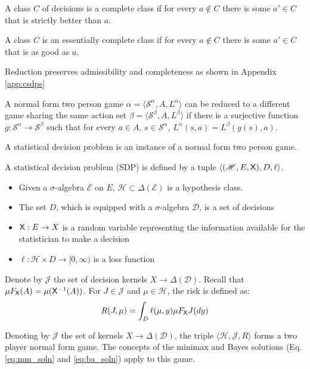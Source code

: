 \begin{definition}
A class $C$ of decisions is a complete class if for every $a\not\in C$ there is some $a'\in C$ that is strictly better than $a$.

A class $C$ is an essentially complete class if for every $a\not\in C$ there is some $a'\in C$ that is as good as $a$.
\end{definition}

Reduction preserves admissibility and completeness as shown in Appendix \ref{app:csdps}

\begin{definition}[Reduction]\label{def:red_sdp_CSDP}
A normal form two person game $\alpha = \langle \mathscr{S}^\alpha, A, L^\alpha\rangle$ can be reduced to a different game sharing the same action set $\beta = \langle \mathscr{S}^\beta, A, L^\beta \rangle$ if there is a surjective function $g:\mathscr{S}^\alpha\to \mathscr{S}^\beta$ such that for every $a\in A$, $s\in \mathscr{S}^\alpha$, $L^\alpha(s,a) = L^\beta(g(s),a)$.
\end{definition}

A statistical decision problem is an instance of a normal form two person game.

\begin{definition}
A statistical decision problem (SDP) is defined by a tuple $\langle (\mathscr{H},E, \mathsf{X}), D, \ell\rangle$.
\begin{itemize}
    \item Given a $\sigma$-algebra $\mathcal{E}$ on $E$, $\mathscr{H}\subset\Delta(\mathcal{E})$ is a hypothesis class.
    \item The set $D$, which is equipped with a $\sigma$-algebra $\mathcal{D}$, is a set of decisions
    \item $\mathsf{X}:E\to X$ is a random variable representing the information available for the statistician to make a decision
    \item $\ell:\mathcal{H}\times D\to [0,\infty)$ is a loss function
\end{itemize}

Denote by $\mathscr{J}$ the set of decision kernels $X\to \Delta(\mathcal{D})$. Recall that $\mu F_{\mathsf{X}}(A)=\mu(\mathsf{X}^{-1}(A))$. For $J\in \mathscr{J}$ and $\mu\in \mathcal{H}$, the risk is defined as:
\begin{align}
    R(J,\mu) = \int_D \ell(\mu,y) \mu F_{\mathsf{X}} J(dy)
\end{align}


Denoting by $\mathscr{J}$  the set of kernels $X\to \Delta(\mathcal{D})$, the triple $\langle \mathscr{H}, \mathscr{J}, R\rangle$ forms a two player normal form game. The concepts of the minimax and Bayes solutions (Eq. \ref{eq:mm_soln} and \ref{eq:ba_soln}) apply to this game.
\end{definition}

